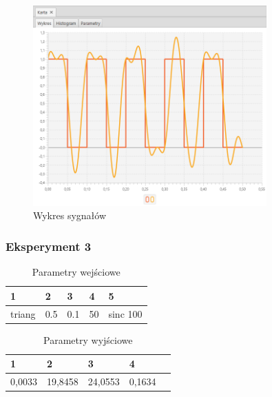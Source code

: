 \documentclass[12pt]{article}
\begin{document}
{{{                \begin{figure}[H]
                    \centering
                    \includegraphics[width=0.8\textwidth]{img/result/experiment2/02/data_draw_original_chart_recon_output_130343.png}
                    \caption{Wykres sygnałów}
                \end{figure}
            }
            \newpage

            \subsubsection{Eksperyment 3} {
                \begin{table}[H]
                    \centering
                    \begin{tabular}{|l|l|l|l|l|}
                        \hline
                        1 & 2 & 3 & 4 & 5   \\ \hline
                        triang & 0.5 & 0.1 & 50 & sinc 100    \\ \hline
                    \end{tabular}
                    \caption{Parametry wejściowe}
                \end{table}

                \begin{table}[H]
                    \centering
                    \begin{tabular}{|l|l|l|l|l|}
                        \hline
                        1 & 2 & 3 & 4   \\ \hline
                        0,0033 & 19,8458 & 24,0553 & 0,1634 \\ \hline
                    \end{tabular}
                    \caption{Parametry wyjściowe}
                \end{table}


}}}
\end{document}
